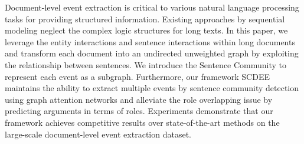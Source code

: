 Document-level event extraction is critical to various natural language processing tasks for providing structured information. Existing approaches by sequential modeling neglect the complex logic structures for long texts. In this paper, we leverage the entity interactions and sentence interactions within long documents and transform each document into an undirected unweighted graph by exploiting the relationship between sentences. We introduce the Sentence Community to represent each event as a subgraph. Furthermore, our framework SCDEE maintains the ability to extract multiple events by sentence community detection using graph attention networks and alleviate the role overlapping issue by predicting arguments in terms of roles. Experiments demonstrate that our framework achieves competitive results over state-of-the-art methods on the large-scale document-level event extraction dataset.
